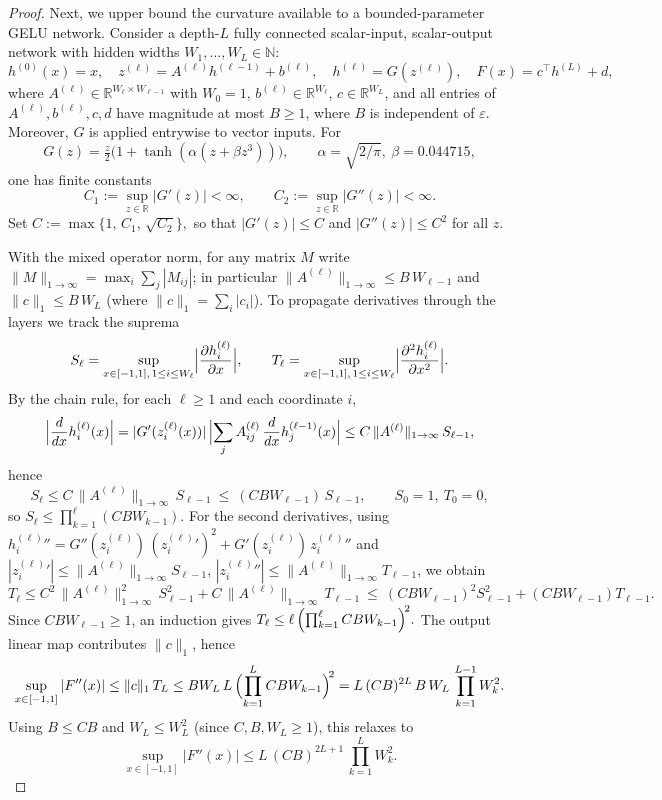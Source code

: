 \documentclass[10pt,a4paper]{amsart}
\begin{document}
\begin{proof}
Next, we upper bound the curvature available to a bounded-parameter GELU network. Consider a depth-$L$ fully connected scalar-input, scalar-output network with hidden widths $W_1,\dots,W_L\in\mathbb N$:
\[
h^{(0)}(x)=x,\quad z^{(\ell)}=A^{(\ell)}h^{(\ell-1)}+b^{(\ell)},\quad h^{(\ell)}=G(z^{(\ell)}),\quad F(x)=c^\top h^{(L)}+d,
\]
where $A^{(\ell)}\in\mathbb R^{W_\ell\times W_{\ell-1}}$ with $W_0=1$, $b^{(\ell)}\in\mathbb R^{W_\ell}$, $c\in\mathbb R^{W_L}$, and all entries of $A^{(\ell)},b^{(\ell)},c,d$ have magnitude at most $B\ge1$, where $B$ is independent of $\varepsilon$. Moreover, $G$ is applied entrywise to vector inputs. For
\[
G(z)=\tfrac{z}{2}\bigl(1+\tanh(\alpha(z+\beta z^3))\bigr),\qquad \alpha=\sqrt{2/\pi},\ \beta=0.044715,
\]
one has finite constants
\[
C_1:=\sup_{z\in\mathbb R}|G'(z)|<\infty,\qquad C_2:=\sup_{z\in\mathbb R}|G''(z)|<\infty.
\]
Set \(
C:=\max\{1,\,C_1,\,\sqrt{C_2}\},
\) so that $|G'(z)|\le C$ and $|G''(z)|\le C^2$ for all $z$.

With the mixed operator norm, for any matrix $M$ write $\|M\|_{1\to\infty}=\max_i\sum_j|M_{ij}|$; in particular $\|A^{(\ell)}\|_{1\to\infty}\le B\,W_{\ell-1}$ and $\|c\|_1\le B\,W_L$ (where $\|c\|_1=\sum_i |c_i|$). To propagate derivatives through the layers we track the suprema
\[
S_\ell=\sup_{x\in[-1,1],\,1\le i\le W_\ell}\Bigl|\frac{\partial h^{(\ell)}_i}{\partial x}\Bigr|,\qquad
T_\ell=\sup_{x\in[-1,1],\,1\le i\le W_\ell}\Bigl|\frac{\partial^2 h^{(\ell)}_i}{\partial x^2}\Bigr|.
\]
By the chain rule, for each $\ell\ge1$ and each coordinate $i$,
\[
\Bigl|\frac{d}{dx}h^{(\ell)}_i(x)\Bigr|
=|G'(z^{(\ell)}_i(x))|\,\Bigl|\sum_j A^{(\ell)}_{ij}\,\frac{d}{dx}h^{(\ell-1)}_j(x)\Bigr|
\le C\,\|A^{(\ell)}\|_{1\to\infty}\,S_{\ell-1},
\]
hence
\[
S_\ell \le C\,\|A^{(\ell)}\|_{1\to\infty}\,S_{\ell-1}\ \le\ (C B W_{\ell-1})\,S_{\ell-1},\qquad S_0=1,\ T_0=0,
\]
so \(
S_\ell \le \prod_{k=1}^{\ell} (C B W_{k-1}).
\) For the second derivatives, using $h^{(\ell)}_i{}''=G''(z^{(\ell)}_i)\,(z^{(\ell)}_i{}')^2+G'(z^{(\ell)}_i)\,z^{(\ell)}_i{}''$ and
$|z^{(\ell)}_i{}'|\le \|A^{(\ell)}\|_{1\to\infty}S_{\ell-1}$, $|z^{(\ell)}_i{}''|\le \|A^{(\ell)}\|_{1\to\infty}T_{\ell-1}$, we obtain
\[
T_\ell \le C^2\,\|A^{(\ell)}\|_{1\to\infty}^2\,S_{\ell-1}^2 + C\,\|A^{(\ell)}\|_{1\to\infty}\,T_{\ell-1}
\ \le\ (C B W_{\ell-1})^2 S_{\ell-1}^2 + (C B W_{\ell-1}) T_{\ell-1}.
\]
Since $C B W_{\ell-1}\ge1$, an induction gives \(
T_\ell \le \ell\,\Bigl(\prod_{k=1}^{\ell} C B W_{k-1}\Bigr)^{\!2}.
\) The output linear map contributes $\|c\|_1$, hence
\[
\sup_{x\in[-1,1]}|F''(x)| \le \|c\|_1\,T_L \le B W_L \, L\,\Bigl(\prod_{k=1}^{L} C B W_{k-1}\Bigr)^{\!2}
= L\,(C B)^{2L}\,B\,W_L\,\prod_{k=1}^{L-1} W_k^{2}.
\]
Using $B\le C B$ and $W_L\le W_L^2$ (since $C,B,W_L\ge1$), this relaxes to
\begin{equation}\label{eq:Fpp}
\sup_{x\in[-1,1]}|F''(x)| \le L\,(C B)^{2L+1}\,\prod_{k=1}^{L} W_k^{2}.
\end{equation}


\end{proof}
\end{document}
